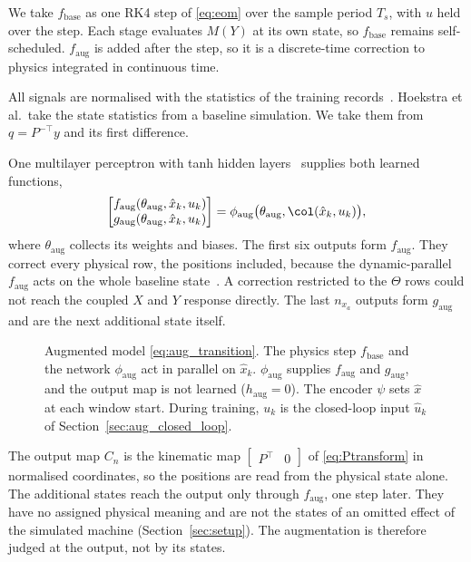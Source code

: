 We take $f_{\mathrm{base}}$ as one RK4 step of \eqref{eq:eom} over the sample
period $T_s$, with $u$ held over the step.
Each stage evaluates $M(Y)$ at its own state, so $f_{\mathrm{base}}$
remains self-scheduled.
$f_{\mathrm{aug}}$ is added after the step, so it is a discrete-time
correction to physics integrated in continuous time.

All signals are normalised with the statistics of the training
records~\cite[Sec.~5.3]{hoekstra2026lfr}.
Hoekstra et al.\ take the state statistics from a baseline simulation.
We take them from $q=P^{-\top}y$ and its first difference.

One multilayer perceptron with tanh hidden
layers~\cite[Eq.~(14)]{hoekstra2026lfr} supplies both learned functions,
\begin{equation}
 \begin{bmatrix}
  f_{\mathrm{aug}}(\theta_{\mathrm{aug}},\hat x_k,u_k)\\
  g_{\mathrm{aug}}(\theta_{\mathrm{aug}},\hat x_k,u_k)
 \end{bmatrix}
 =\phi_{\mathrm{aug}}\bigl(\theta_{\mathrm{aug}},\col(\hat x_k,u_k)\bigr),
 \label{eq:aug_mlp}
\end{equation}
where $\theta_{\mathrm{aug}}$ collects its weights and biases.
The first six outputs form $f_{\mathrm{aug}}$.
They correct every physical row, the positions included, because the
dynamic-parallel $f_{\mathrm{aug}}$ acts on the whole baseline
state~\cite[Sec.~2]{hoekstra2025lfr}.
A correction restricted to the $\Theta$ rows could not reach the coupled $X$
and $Y$ response directly.
The last $n_{x_a}$ outputs form $g_{\mathrm{aug}}$ and are the next
additional state itself.

\begin{figure}[t]
 \centering
 \resizebox{\columnwidth}{!}{}
 \caption{Augmented model \eqref{eq:aug_transition}. The physics step
 $f_{\mathrm{base}}$ and the network $\phi_{\mathrm{aug}}$ act in parallel on
 $\hat x_k$. $\phi_{\mathrm{aug}}$ supplies $f_{\mathrm{aug}}$ and
 $g_{\mathrm{aug}}$, and the output map is not learned
 ($h_{\mathrm{aug}}=0$). The encoder $\psi$ sets $\hat x$ at each window
 start. During training, $u_k$ is the closed-loop input $\hat u_k$ of
 Section~\ref{sec:aug_closed_loop}.}
 \label{fig:aug_structure}
\end{figure}

The output map $C_n$ is the kinematic map
$\begin{bmatrix}P^\top & 0\end{bmatrix}$ of \eqref{eq:Ptransform} in
normalised coordinates, so the positions are read from the physical state
alone.
The additional states reach the output only through $f_{\mathrm{aug}}$, one
step later.
They have no assigned physical meaning and are not the states of an omitted
effect of the simulated machine (Section~\ref{sec:setup}).
The augmentation is therefore judged at the output, not by its states.

